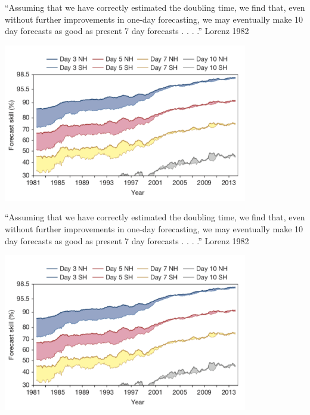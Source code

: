 \documentclass[aspectratio=169]{beamer}
\begin{document}
\begin{frame}

``Assuming that we have correctly estimated the doubling time, we find that, even without further improvements in one-day forecasting, we may eventually make 10 day forecasts as good as present 7 day forecasts . . . .'' Lorenz 1982 \pause

\begin{center}
\includegraphics[width = 0.8\textwidth]{figures/bauer_quiet_2015_fig1}
\end{center}

\end{frame}
\begin{frame}

``Assuming that we have correctly estimated the doubling time, we find that, even without further improvements in one-day forecasting, we may eventually make 10 day forecasts as good as present 7 day forecasts . . . .'' Lorenz 1982 \pause

\begin{center}
\includegraphics[width = 0.8\textwidth]{figures/bauer_quiet_2015_fig1}
\end{center}

\end{frame}
\end{document}
